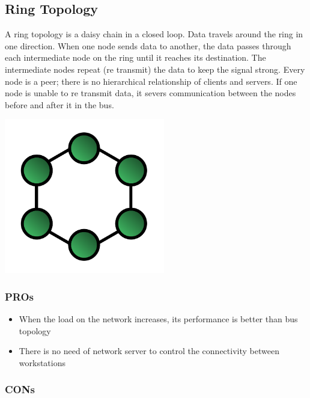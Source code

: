 \documentclass[a4paper,12pt]{book}
\begin{document}
\clearpage

\subsection{Ring Topology}

A ring topology is a daisy chain in a closed loop. Data travels around the ring in one direction. When one node sends data to another, the data passes through each intermediate node on the ring until it reaches its destination. The intermediate nodes repeat (re transmit) the data to keep the signal strong.\footnotemark{} Every node is a peer; there is no hierarchical relationship of clients and servers. If one node is unable to re transmit data, it severs communication between the nodes before and after it in the bus.

\noindent \includegraphics[width=7cm]{./RingNetwork.svg.PNG} \newline
{}

\subsubsection{PROs}

\begin{itemize}
\item {When the load on the network increases, its performance is better than bus topology}
\item {There is no need of network server to control the connectivity between workstations}
\end{itemize}

\subsubsection{CONs}
\end{document}
